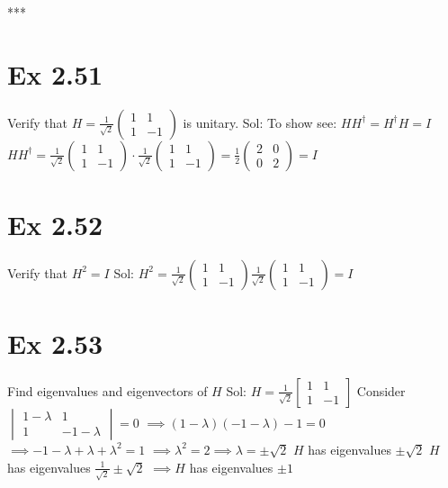\documentclass{article}
\newcommand{\0}{{$|0\rangle$}}
\newcommand{\1}{{$|1\rangle$}}
\begin{document}
***
\newpage
\section*{Ex 2.51}
Verify that $H = \frac{1}{\sqrt{2}}\begin{pmatrix} 1 & 1 \\ 1 & -1 \end{pmatrix}$ is unitary. 
Sol: To show see: $HH^{\dagger}=H^{\dagger}H=I$  
$HH^{\dagger} = \frac{1}{\sqrt{2}}\begin{pmatrix} 1 & 1 \\ 1 & -1 \end{pmatrix} \cdot \frac{1}{\sqrt{2}}\begin{pmatrix} 1 & 1 \\ 1 & -1 \end{pmatrix} = \frac{1}{2}\begin{pmatrix} 2 & 0 \\ 0 & 2 \end{pmatrix} = I$

\newpage
\section*{Ex 2.52}
Verify that $H^2=I$  
Sol: $H^2 = \frac{1}{\sqrt{2}} \begin{pmatrix} 1 & 1 \\ 1 & -1 \end{pmatrix} \frac{1}{\sqrt{2}}\begin{pmatrix} 1 & 1 \\ 1 & -1 \end{pmatrix} = I$

\newpage
\section*{Ex 2.53}
Find eigenvalues and eigenvectors of $H$  
Sol: $H = \frac{1}{\sqrt{2}} \begin{bmatrix} 1 & 1 \\ 1 & -1 \end{bmatrix}$  
Consider $\begin{vmatrix} 1-\lambda & 1 \\ 1 & -1-\lambda \end{vmatrix}=0$  
$\implies (1-\lambda)(-1-\lambda)-1=0$  
$\implies -1-\lambda+\lambda+\lambda^2=1$  
$\implies \lambda^2=2 \implies \lambda=\pm\sqrt{2}$  
$H$ has eigenvalues $\pm\sqrt{2}$  
$H$ has eigenvalues $\frac{1}{\sqrt{2}}\pm\sqrt{2}$  
$\implies H$ has eigenvalues $\pm 1$
\end{document}
